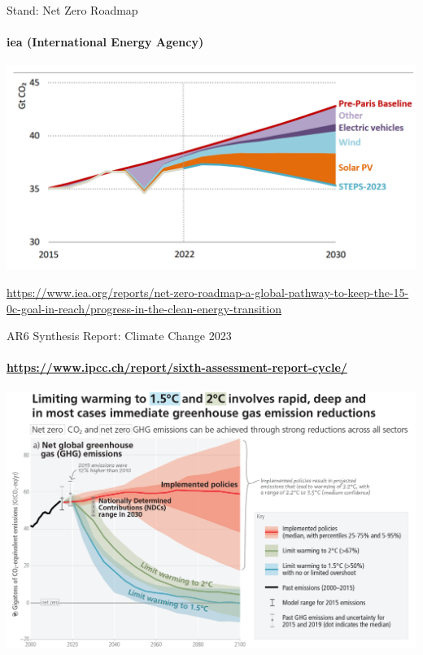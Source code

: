 \begin{frame}{Stand: Net Zero Roadmap}
	\framesubtitle{\hspace*{\fill}iea (International Energy Agency)\cite{iea_net_zero2023}}
	\begin{center}
			\includegraphics[width=.75\textwidth]{../Figures/global-energy-sector-co2-emissions-in-the-pre-paris-baseline-and-stated-policies-scenarios-2015-2030.png}
			
    \end{center}
	
\vfill

	\href{https://www.iea.org/reports/net-zero-roadmap-a-global-pathway-to-keep-the-15-0c-goal-in-reach/progress-in-the-clean-energy-transition}{\tiny https://www.iea.org/reports/net-zero-roadmap-a-global-pathway-to-keep-the-15-0c-goal-in-reach/progress-in-the-clean-energy-transition}
	\end{frame}	
		
\begin{frame}{AR6 Synthesis Report: Climate Change 2023}
\framesubtitle{\hspace*{\fill} \href{https://www.ipcc.ch/report/sixth-assessment-report-cycle/}{\tiny https://www.ipcc.ch/report/sixth-assessment-report-cycle/}}
\includegraphics[width=1.00\textwidth]{../Figures/IPCC_AR6_SYR_SPM_Figure5.png}


\end{frame}


